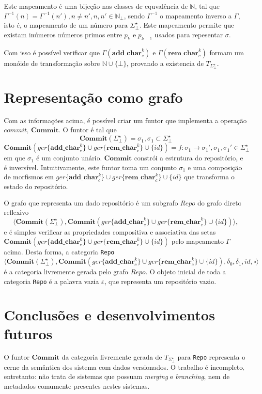 \documentclass[a4paper]{article}
\newcommand{\co}{{$commit$}}
\newcommand{\baseset}{{\Sigma^\star_\bot}}
\newcommand{\addc}[2]{{\mathbf{add\_char}_{#1}^{#2}}}
\newcommand{\opa}{{\addc{c}{k}}}
\newcommand{\remc}[2]{{\mathbf{rem\_char}_{#1}^{#2}}}
\newcommand{\gopa}{{ger\{\opa\}}}
\newcommand{\opb}{{\remc{c}{k}}}
\newcommand{\gopb}{{ger\{\opb\}}}
\newcommand{\transMon}{{T_\baseset}}
\newcommand{\composition}{{\circ}}
\newcommand{\morun}{{\gopa \cup \gopb \cup \{id\}}}
\newcommand{\commit}{{\mathbf{Commit}}}
\begin{document}
Este mapeamento é uma bijeção nas classes de equvalência de $\mathbb{N}$, tal que $\Gamma^{-1}(n) = \Gamma^{-1}(n\prime), n \neq n\prime, n, n\prime \in \mathbb{N}_\bot$, sendo $\Gamma^{-1}$ o mapeamento inverso a $\Gamma$, isto é, o mapeamento de um número para $\baseset$. Este mapeamento permite que existam inúmeros números primos entre $p_k$ e $p_{k+1}$ usados para repesentar $\sigma$.

Com isso é possível verificar que $\Gamma(\opa)$ e $\Gamma(\opb)$ formam um monóide de transformação sobre $\mathbb{N} \cup \{\bot\}$, provando a existencia de $\transMon$.


\section*{Representação como grafo}
Com as informações acima, é possível criar um funtor que implementa a operação \co, $\commit$. O funtor é tal que
\begin{equation} \label{fun:set}
\commit(\baseset) = \sigma_1, \sigma_1 \subset \baseset
\end{equation}
\begin{equation} \label{fun:mor}
\commit(\morun) = f:\sigma_1 \to \sigma_1\prime, \sigma_1,\sigma_1\prime \in \baseset
\end{equation}
em que $\sigma_1$ é um conjunto unário. $\commit$ constrói a estrutura do repositório, e é inversível. Intuitivamente, este funtor toma um conjunto $\sigma_1$ e uma composição de morfismos em $\morun$ que transforma o estado do repositório. 

O grafo que representa um dado repositório é um subgrafo $Repo$ do grafo direto reflexivo
\[
\langle \commit(\baseset), \commit(\morun)\rangle,
\]
e é simples verificar as propriedades compositiva e associativa das setas $\commit(\morun)$ pelo mapeamento $\Gamma$ acima. Desta forma, a categoria {\tt Repo} 
 \[
\langle \commit(\baseset), \commit(\morun), \delta_0, \delta_1, id, \composition\rangle
\]
é a categoria livremente gerada pelo grafo $Repo$. O objeto inicial de toda a categoria {\tt Repo} é a palavra vazia $\varepsilon$, que representa um repositório vazio.

\section*{Conclusões e desenvolvimentos futuros}
O funtor $\commit$ da categoria livremente gerada de $\transMon$ para {\tt Repo} representa o cerne da semântica dos sistema com dados versionados. O trabalho é incompleto, entretanto: não trata de sistemas que possuam {\it merging} e {\it branching}, nem de metadados comumente presentes nestes sistemas.
\end{document}
